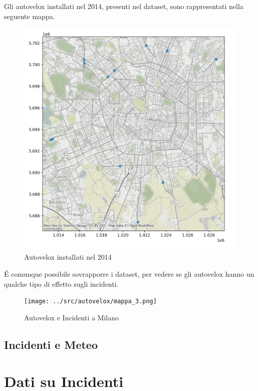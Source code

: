 \documentclass[a4paper]{report}
\begin{document}
Gli autovelox installati nel 2014, presenti nel dataset, sono rappresentati nella seguente mappa.
\begin{figure}[!ht]
    \includegraphics[width=\linewidth]{../src/autovelox/autovelox_2014.png}
    \caption{Autovelox installati nel 2014}
    \label{fig:autovelox_2014}
\end{figure}

\'E comunque possibile sovrapporre i dataset, per vedere se gli autovelox hanno un qualche tipo di 
effetto sugli incidenti.

\begin{figure}[!ht]
    \texttt{[image: ../src/autovelox/mappa\_3.png]}
    \caption{Autovelox e Incidenti a Milano}
    \label{fig:autovelox}
\end{figure}



\clearpage
\section{Incidenti e Meteo}

\clearpage
\chapter{Dati su Incidenti}
\end{document}
